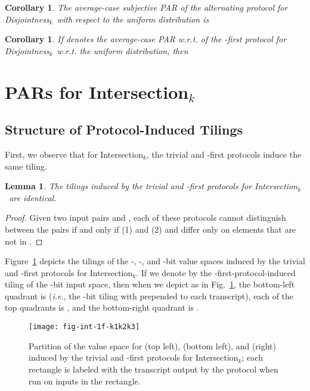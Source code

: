 \documentclass{article}
\theoremstyle{theorem}
\newtheorem{cor}[theorem]{Corollary}
\newtheorem{lemma}[theorem]{Lemma}
\theoremstyle{definition}
\theoremstyle{remark}
\newcommand{\ie}{\emph{i.e.}}
\newcommand{\disjoint}{{\sc Dis\-joint\-ness}\ensuremath{_k}}
\newcommand{\intersection}{{\sc In\-ter\-sec\-tion}\ensuremath{_k}}
\begin{document}
\begin{cor}
The average-case subjective PAR of the alternating protocol for \disjoint\ with respect to the uniform distribution is

\end{cor}

\begin{cor}
If  denotes the average-case PAR w.r.t.  of the -first protocol for \disjoint\ w.r.t. the uniform distribution, then

\end{cor}


\section{PARs for \intersection}\label{sec:intersection}


\subsection{Structure of Protocol-Induced Tilings}


First, we observe that for \intersection, the trivial and -first protocols induce the same tiling.
\begin{lemma}\label{lem:int-triv1first}
The tilings induced by the trivial and -first protocols for \intersection\ are identical.
\end{lemma}
\begin{proof}
Given two input pairs  and , each of these protocols cannot distinguish between the pairs if and only if (1)  and (2)  and  differ only on elements that are not in .
\end{proof}

Figure~\ref{fig:int-1f-k1k2k3} depicts the tilings of the -, -, and -bit value spaces induced by the trivial and -first protocols for \intersection.  If we denote by  the -first-protocol-induced tiling of the -bit input space, then when we depict  as in Fig.~\ref{fig:int-1f-k1k2k3}, the bottom-left quadrant is  (\ie, the -bit tiling with  prepended to each transcript), each of the top quadrants is , and the bottom-right quadrant is .
\begin{figure}[htp]
\begin{center}
\texttt{[image: fig-int-1f-k1k2k3]}
\caption{Partition of the value space for  (top left),  (bottom left), and  (right) induced by the trivial and -first protocols for \intersection; each rectangle is labeled with the transcript output by the protocol when run on inputs in the rectangle.}\label{fig:int-1f-k1k2k3}
\end{center}
\end{figure}
\end{document}
